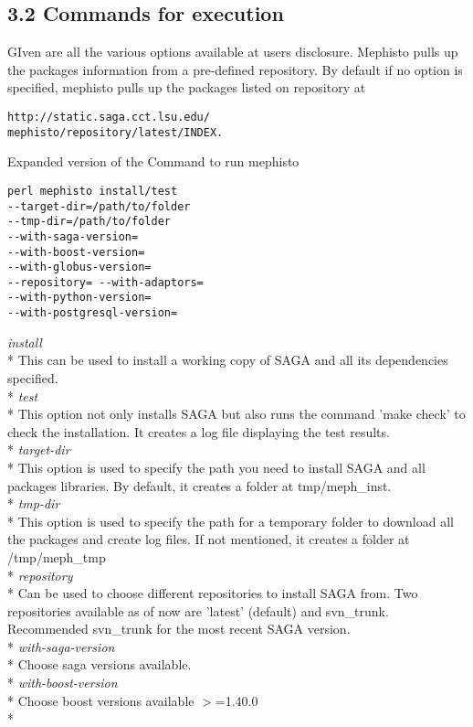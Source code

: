 \documentclass[a4paper,10pt]{article}
\begin{document}
\begin{multicols}{2}
\subsection*{\normalsize 3.2 Commands for execution}
GIven are all the various options available at users disclosure. Mephisto pulls up the packages information from a pre-defined repository. 
By default if no option is specified, mephisto pulls up the packages listed on repository at
\begin{verbatim} 
http://static.saga.cct.lsu.edu/
mephisto/repository/latest/INDEX. 
\end{verbatim}
Expanded version of the Command to run mephisto
\begin{verbatim} 
perl mephisto install/test 
--target-dir=/path/to/folder 
--tmp-dir=/path/to/folder 
--with-saga-version= 
--with-boost-version= 
--with-globus-version= 
--repository= --with-adaptors= 
--with-python-version= 
--with-postgresql-version=
\end{verbatim} 
\emph{install} \\*
 This can be used to install a working copy of SAGA and all its 
 dependencies specified. \\*
\emph{test} \\*
 This option not only installs SAGA but also runs the command 
 'make check' to check the installation. It creates a log file displaying 
 the test results. \\*
\emph{target-dir} \\*
 This option is used to specify the path you need to install SAGA and all 
 packages libraries. By default, it creates a folder at tmp/meph\_inst.\\*
\emph{tmp-dir} \\*
 This option is used to specify the path for a temporary folder to 
 download all the packages and create log files. If not mentioned, it 
 creates a folder at /tmp/meph\_tmp\\*
\emph{repository} \\*
 Can be used to choose different repositories to install SAGA from. 
 Two repositories available as of now are 'latest' (default) and svn\_trunk. 
 Recommended svn\_trunk for the most recent SAGA version. \\*
\emph{with-saga-version}\\*
 Choose saga versions available.\\*
\emph{with-boost-version}\\*
Choose boost versions available $>$=1.40.0\\*

\end{multicols}
\end{document}
